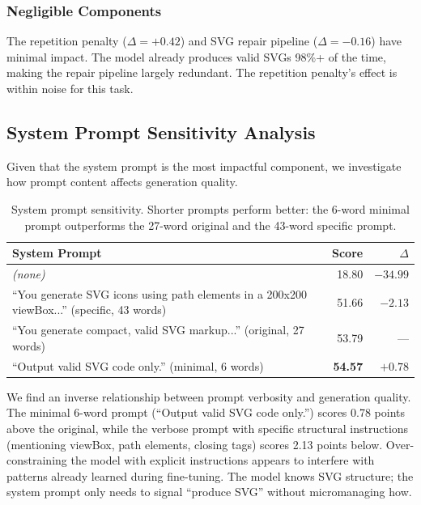 \documentclass[11pt]{article}
\begin{document}
\subsubsection{Negligible Components}

The repetition penalty ($\Delta = +0.42$) and SVG repair pipeline ($\Delta = -0.16$) have minimal impact. The model already produces valid SVGs 98\%+ of the time, making the repair pipeline largely redundant. The repetition penalty's effect is within noise for this task.

\subsection{System Prompt Sensitivity Analysis}

Given that the system prompt is the most impactful component, we investigate how prompt content affects generation quality.

\begin{table}[h]
\centering
\small
\begin{tabular}{p{4.2cm}rr}
\toprule
\textbf{System Prompt} & \textbf{Score} & \textbf{$\Delta$} \\
\midrule
\textit{(none)} & 18.80 & $-34.99$ \\
\small{``You generate SVG icons using path elements in a 200x200 viewBox...''} (specific, 43 words) & 51.66 & $-2.13$ \\
\small{``You generate compact, valid SVG markup...''} (original, 27 words) & 53.79 & --- \\
\small{``Output valid SVG code only.''} (minimal, 6 words) & \textbf{54.57} & $+0.78$ \\
\bottomrule
\end{tabular}
\caption{System prompt sensitivity. Shorter prompts perform better: the 6-word minimal prompt outperforms the 27-word original and the 43-word specific prompt.}
\label{tab:sysprompt}
\end{table}

We find an inverse relationship between prompt verbosity and generation quality. The minimal 6-word prompt (``Output valid SVG code only.'') scores 0.78 points above the original, while the verbose prompt with specific structural instructions (mentioning viewBox, path elements, closing tags) scores 2.13 points below. Over-constraining the model with explicit instructions appears to interfere with patterns already learned during fine-tuning. The model knows SVG structure; the system prompt only needs to signal ``produce SVG'' without micromanaging how.
\end{document}
